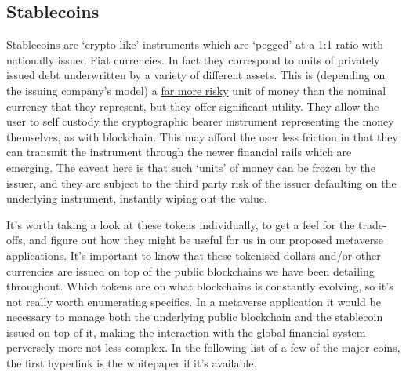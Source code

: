 \subsection{Stablecoins}
Stablecoins are `crypto like' instruments which are `pegged' at a 1:1 ratio with nationally issued Fiat currencies. In fact they correspond to units of privately issued  debt underwritten by a variety of different assets. This is (depending on the issuing company's model) a \href{https://www.americanbanker.com/opinion/ststablecoins-are-backed-by-reserves-give-us-a-break}{far more risky} unit of money than the nominal currency that they represent, but they offer significant utility. They allow the user to self custody the cryptographic bearer instrument representing the money themselves, as with blockchain. This may afford the user less friction in that they can transmit the instrument through the newer financial rails which are emerging. The caveat here is that such `units' of money can be frozen by the issuer, and they are subject to the third party risk of the issuer defaulting on the underlying instrument, instantly wiping out the value.\par
It's worth taking a look at these tokens individually, to get a feel for the trade-offs, and figure out how they might be useful for us in our proposed metaverse applications. It's important to know that these tokenised dollars and/or other currencies are issued on top of the public blockchains we have been detailing throughout. Which tokens are on what blockchains is constantly evolving, so it's not really worth enumerating specifics. In a metaverse application it would be necessary to manage both the underlying public blockchain and the stablecoin issued on top of it, making the interaction with the global financial system perversely more not less complex. In the following list of a few of the major coins, the first hyperlink is the whitepaper if it's available.
